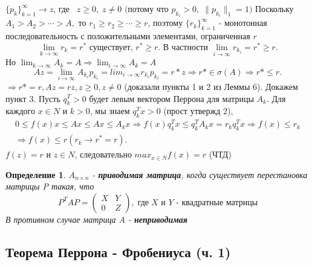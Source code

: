 \documentclass[a4paper,12pt,leqno]{article} %
\newtheorem{definition}{Определение}
\begin{document}
     $\{p_k\}^{\infty}_{k = 1} \rightarrow z$, где 
      $z \geq 0, \; z \neq 0 \text{ (потому что } p_{k_{i}} > 0, \; \|p_{k_{i}}\|_1 = 1)$
     Поскольку $A_1 > A_2 > \cdots > A,$ то $r_1 \geq r_2 \geq \cdots \geq r$,
     поэтому $\{r_k\}^\infty_{k=1}$ - монотонная последовательность с положительными 
     элементами, ограниченная $r$
     \begin{equation*}
        \lim_{k \to \infty} r_k = r^* \text{ существует, } r^* \geq r. \text{ В частности }
        \lim_{i \to \infty} r_{k_{i}} = r^* \geq r.
     \end{equation*}  
     Но $\lim_{k \to \infty} A_k = A \Rightarrow \lim_{i\to \infty} A_k = A$
     \begin{equation*}
        Az = \lim_{i \to \infty} A_{k_{i}}p_{k_{i}} = lim_{i \to \infty}r_{k_{i}}p_{k_{i}} =
        r*z \Rightarrow r* \in \sigma(A) \Rightarrow r* \leq r.
     \end{equation*}
     $\Rightarrow r* = r, Az = rz, z \geq 0, z \neq 0$ (доказали пункты 1 и 2 из Леммы 6).
     Докажем пункт 3. Пусть $q^T_k > 0$ будет левым вектором Перрона для матрицы $A_k$.
     Для каждого $x \in N$ и $k > 0$, мы знаем $q^T_kx > 0$ (прост утвержд 2), 
     \begin{align*}
        0 \leq f(x)x \leq Ax \leq Ax \leq A_kx \Rightarrow f(x)q^T_kx 
        \leq q^T_kA_kx=r_kq^T_kx \Rightarrow f(x) \leq r_k
        \\ \Rightarrow f(x) \leq r (r_k \rightarrow r^* = r).
     \end{align*} 
     $f(z) = r$ и $z \in N$, следовательно $max_{x \in N}f(x) = r$ \; (ЧТД)
     \begin{definition}
         $A_{n \times n}$ - \textbf{приводимая матрица}, когда существует перестановка
         матрицы P такая, что
         \begin{equation*}
            P^TAP = \begin{pmatrix}
                X & Y \\
                0 & Z
             \end{pmatrix},
             \; \text{где} \; X  \text{ и } Y \text{ - квадратные матрицы}
         \end{equation*}
         В противном случае матрица A - \textbf{неприводимая} 
     \end{definition}
    \subsection*{Теорема Перрона - Фробениуса (ч. 1)} 
    
\end{document}
